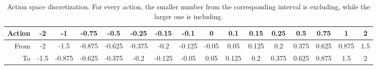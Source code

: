 \begin{table}[htbp]
\footnotesize
\centering
\centerfloat
\setlength{\tabcolsep}{3pt}
\begin{tabular}{@{}rccccccccccccccc@{}}
\toprule
Action & -2   & -1     & -0.75  & -0.5   & -0.25  & -0.15  & -0.1   & 0     & 0.1   & 0.15  & 0.25  & 0.5   & 0.75  & 1     & 2 \\ \midrule
From   & -2   & -1.5   & -0.875 & -0.625 & -0.375 & -0.2   & -0.125 & -0.05 & 0.05  & 0.125 & 0.2   & 0.375 & 0.625 & 0.875 & 1.5 \\ 
To     & -1.5 & -0.875 & -0.625 & -0.375 & -0.2   & -0.125 & -0.05  & 0.05  & 0.125 & 0.2   & 0.375 & 0.625 & 0.875 & 1.5   & 2   \\ \bottomrule
\end{tabular}
\caption[Action space discretization]{Action space discretization. For every action, the smaller number from the corresponding interval is excluding, while the larger one is including.}
\label{tab:action_dist}
\end{table}